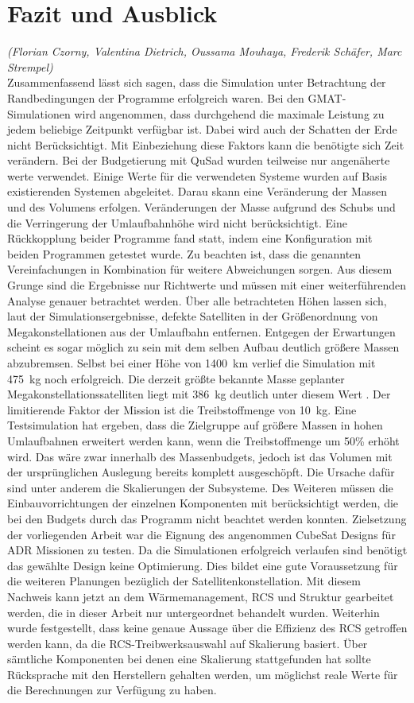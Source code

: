 \chapter{Fazit und Ausblick}
	\hfill\emph{(Florian Czorny, Valentina Dietrich, Oussama Mouhaya, Frederik Schäfer, Marc Strempel)}	\\
Zusammenfassend lässt sich sagen, dass die Simulation unter Betrachtung der Randbedingungen der Programme erfolgreich waren. Bei den GMAT-Simulationen wird angenommen, dass durchgehend die maximale Leistung zu jedem beliebige Zeitpunkt verfügbar ist. Dabei wird auch der Schatten der Erde nicht Berücksichtigt. Mit Einbeziehung diese Faktors kann die benötigte sich Zeit verändern. Bei der Budgetierung mit QuSad wurden teilweise nur angenäherte werte verwendet. Einige Werte für die verwendeten Systeme wurden auf Basis existierenden Systemen abgeleitet. Darau skann eine Veränderung der Massen und des Volumens erfolgen. Veränderungen der Masse aufgrund des Schubs und die Verringerung der Umlaufbahnhöhe wird nicht berücksichtigt. Eine Rückkopplung beider Programme fand statt, indem eine Konfiguration mit beiden Programmen getestet wurde. Zu beachten ist, dass die genannten Vereinfachungen in Kombination für weitere Abweichungen sorgen. Aus diesem Grunge sind die Ergebnisse nur Richtwerte und müssen mit einer weiterführenden Analyse genauer betrachtet werden. 
 Über alle betrachteten Höhen lassen sich, laut der Simulationsergebnisse, defekte Satelliten in der Größenordnung von Megakonstellationen aus der Umlaufbahn entfernen. Entgegen der Erwartungen scheint es sogar möglich zu sein mit dem selben Aufbau deutlich größere Massen abzubremsen. Selbst bei einer Höhe von \SI{1400}{\kilo\metre} verlief die Simulation mit \SI{475}{\kilogram} noch erfolgreich. Die derzeit größte bekannte Masse geplanter Megakonstellationssatelliten liegt mit \SI{386}{\kilogram} deutlich unter diesem Wert \cite{BenLarbi.2017}. Der limitierende Faktor der Mission ist die Treibstoffmenge von \SI{10}{\kilogram}. Eine Testsimulation hat ergeben, dass die Zielgruppe auf größere Massen in hohen Umlaufbahnen erweitert werden kann, wenn die Treibstoffmenge um \num{50}\% erhöht wird. Das wäre zwar innerhalb des Massenbudgets, jedoch ist das Volumen mit der ursprünglichen Auslegung bereits komplett ausgeschöpft. Die Ursache dafür sind unter anderem die Skalierungen der Subsysteme. Des Weiteren müssen die Einbauvorrichtungen der einzelnen Komponenten mit berücksichtigt werden, die bei den Budgets durch das Programm nicht beachtet werden konnten. Zielsetzung der vorliegenden Arbeit war die Eignung des angenommen CubeSat Designs für ADR Missionen zu testen. Da die  Simulationen erfolgreich verlaufen sind benötigt das gewählte Design keine Optimierung. Dies bildet eine gute Voraussetzung für die weiteren Planungen bezüglich der Satellitenkonstellation. Mit diesem Nachweis kann jetzt an dem Wärmemanagement, RCS und Struktur gearbeitet werden, die in dieser Arbeit nur untergeordnet behandelt wurden. Weiterhin wurde festgestellt, dass keine genaue Aussage über die Effizienz des RCS getroffen werden kann, da die RCS-Treibwerksauswahl auf Skalierung basiert. Über sämtliche Komponenten bei denen eine Skalierung stattgefunden hat sollte Rücksprache mit den Herstellern gehalten werden, um möglichst reale Werte für die Berechnungen zur Verfügung zu haben. 
